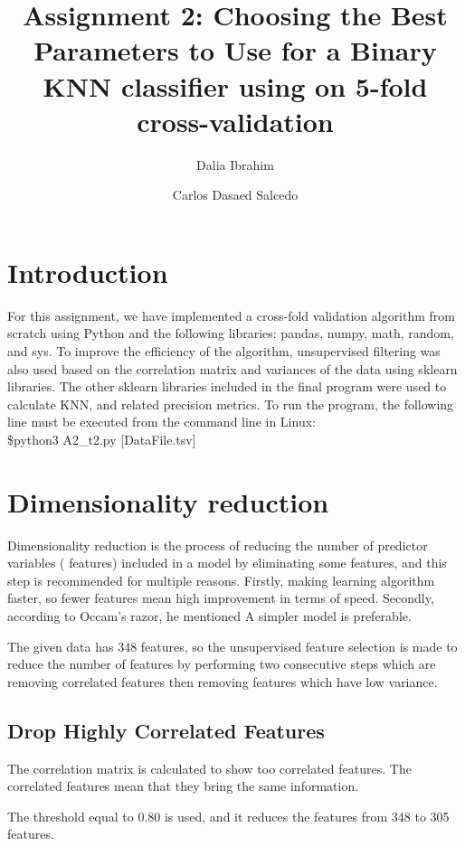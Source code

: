 \documentclass{article}
\author[1]{Dalia Ibrahim}
\author[2]{Carlos Dasaed Salcedo}
\affil[ ]{Studnet ID}
\affil[1]{201893217}
\affil[2]{201892008}
\begin{document}
  

\title{ Assignment 2: Choosing the Best Parameters to Use for a Binary KNN classifier using on 5-fold cross-validation}


\maketitle
 \section{Introduction}
For this assignment, we have implemented a cross-fold validation algorithm from scratch using Python and the following libraries: pandas, numpy, math, random, and sys. To improve the efficiency of the algorithm, unsupervised filtering was also used based on the correlation matrix and variances of the data using sklearn libraries. The other sklearn libraries included in the final program were used to calculate KNN, and related precision metrics. To run the program, the following line must be executed from the command line in Linux: \\
\$python3 A2\_t2.py [DataFile.tsv]\\

 \section{ Dimensionality reduction}
Dimensionality reduction is the process of reducing the number of predictor variables ( features) included in a model by eliminating some features, and this step is recommended for multiple reasons. Firstly, making learning algorithm faster, so fewer features mean high improvement in terms of speed. Secondly, according to Occam's razor, he mentioned  A simpler model is preferable.

The given data has  348 features, so the unsupervised feature selection is made to reduce the number of features by performing two consecutive steps which are removing correlated features then removing features which have low variance.
\subsection{Drop Highly Correlated Features}


The correlation matrix is calculated to show too correlated features. The correlated features mean that they bring the same information. 

The threshold equal to  0.80 is used, and it reduces the features from 348 to 305 features.
\end{document}
